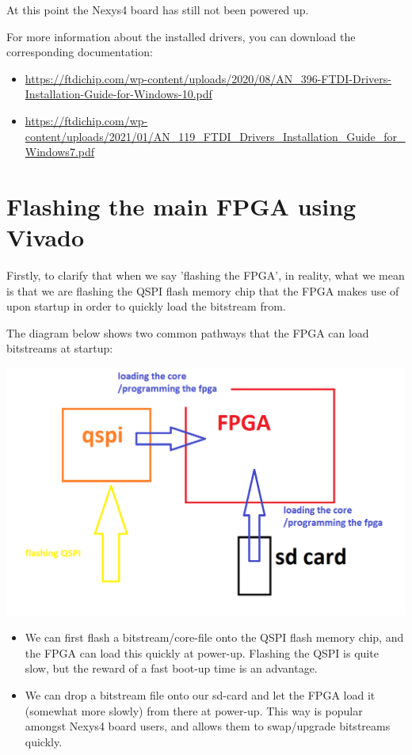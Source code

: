 At this point the Nexys4 board has still not been powered up.

For more information about the installed drivers, you can download the corresponding documentation:

\begin{itemize}
  \item \url{https://ftdichip.com/wp-content/uploads/2020/08/AN\_396-FTDI-Drivers-Installation-Guide-for-Windows-10.pdf}
  \item \url{https://ftdichip.com/wp-content/uploads/2021/01/AN\_119\_FTDI\_Drivers\_Installation\_Guide\_for\_Windows7.pdf}
\end{itemize}

\section{Flashing the main FPGA using Vivado}
\label{sec:mainfpgaflashing}

Firstly, to clarify that when we say 'flashing the FPGA', in reality, what we mean is that we are flashing the QSPI flash memory chip that the FPGA makes use of upon startup in order to quickly load the bitstream from.

The diagram below shows two common pathways that the FPGA can load bitstreams at startup:

\begin{center}
\includegraphics[width=0.8\linewidth]{images/flashing_fpga.png}
\end{center}

\begin{itemize}
  \item We can first flash a bitstream/core-file onto the QSPI flash memory chip, and the FPGA can load this quickly at power-up. Flashing the QSPI is quite slow, but the reward of a fast boot-up time is an advantage.
  \item We can drop a bitstream file onto our sd-card and let the FPGA load it (somewhat more slowly) from there at power-up. This way is popular amongst Nexys4 board users, and allows them to swap/upgrade bitstreams quickly.
\end{itemize}

